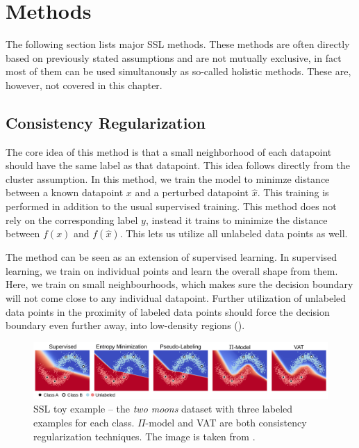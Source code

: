 \section{Methods}
\label{sec:SslMethods}

The following section lists major SSL methods. These methods are often directly based on previously stated assumptions and are not mutually exclusive, in fact most of them can be used simultanously as so-called holistic methods. These are, however, not covered in this chapter.


\subsection{Consistency Regularization}

The core idea of this method is that a small neighborhood of each datapoint should have the same label as that datapoint. This idea follows directly from the cluster assumption. In this method, we train the model to minimze distance between a known datapoint $x$ and a perturbed datapoint $\hat{x}$. This training is performed in addition to the usual supervised training. This method does not rely on the corresponding label $y$, instead it trains to minimize the distance between $f(x)$ and $f(\hat{x})$. This lets us utilize all unlabeled data points as well.

The method can be seen as an extension of supervised learning. In supervised learning, we train on individual points and learn the overall shape from them. Here, we train on small neighbourhoods, which makes sure the decision boundary will not come close to any individual datapoint. Further utilization of unlabeled data points in the proximity of labeled data points should force the decision boundary even further away, into low-density regions (\cite{SslTechnicalReport}).

\begin{figure}[ht]
    \centering
    \includegraphics[width=145mm]{../img/ssl-toy.png}
    \caption{SSL toy example -- the \emph{two moons} dataset with three labeled examples for each class. $\Pi$-model and VAT are both consistency regularization techniques. The image is taken from \cite{SemisupervisedOverview}.}
    \label{fig:SslToy}
\end{figure}


